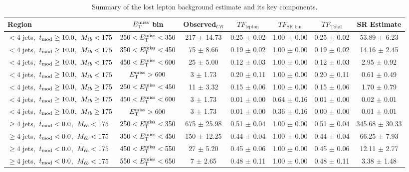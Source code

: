 \begin{table}
\centering
\small
\caption{Summary of the lost lepton background estimate and its key components.}
\label{tab:stop:lostlep:results}
\begin{tabular}{|l|c|c|c|c|c|c|} \hline
Region & $E_\text{T}^\text{miss}$ bin & Observed$_{CR}$ & $TF_\text{lepton}$ & $TF_\text{SR bin}$ & $TF_\text{Total}$ & SR Estimate \\ \hline \hline
 $<4$ jets,~$t_\text{mod} \ge10.0$,~$M_{\ell b} <175$ & $250<E_\text{T}^\text{miss}<350$  & 217 $\pm$ 14.73  & 0.25 $\pm$ 0.02  & 1.00 $\pm$ 0.00 & 0.25 $\pm$ 0.02  & 53.89 $\pm$ 6.23  \\
 $<4$ jets,~$t_\text{mod} \ge10.0$,~$M_{\ell b} <175$ & $350<E_\text{T}^\text{miss}<450$  & 75 $\pm$ 8.66  & 0.19 $\pm$ 0.02  & 1.00 $\pm$ 0.00 & 0.19 $\pm$ 0.02  & 14.16 $\pm$ 2.45  \\
 $<4$ jets,~$t_\text{mod} \ge10.0$,~$M_{\ell b} <175$ & $450<E_\text{T}^\text{miss}<600$  & 25 $\pm$ 5.00  & 0.12 $\pm$ 0.03  & 1.00 $\pm$ 0.00 & 0.12 $\pm$ 0.03  & 2.95 $\pm$ 0.92  \\
 $<4$ jets,~$t_\text{mod} \ge10.0$,~$M_{\ell b} <175$ & $E_\text{T}^\text{miss}>600$  & 3 $\pm$ 1.73  & 0.20 $\pm$ 0.11  & 1.00 $\pm$ 0.00 & 0.20 $\pm$ 0.11  & 0.61 $\pm$ 0.49  \\
\hline
 $<4$ jets,~$t_\text{mod} \ge10.0$,~$M_{\ell b} \ge175$ & $250<E_\text{T}^\text{miss}<450$  & 11 $\pm$ 3.32  & 0.15 $\pm$ 0.06  & 1.00 $\pm$ 0.00 & 0.15 $\pm$ 0.06  & 1.70 $\pm$ 0.79  \\
 $<4$ jets,~$t_\text{mod} \ge10.0$,~$M_{\ell b} \ge175$ & $450<E_\text{T}^\text{miss}<600$  & 3 $\pm$ 1.73  & 0.01 $\pm$ 0.00  & 0.64 $\pm$ 0.16 & 0.01 $\pm$ 0.00  & 0.02 $\pm$ 0.01  \\
 $<4$ jets,~$t_\text{mod} \ge10.0$,~$M_{\ell b} \ge175$ & $E_\text{T}^\text{miss}>600$  & 3 $\pm$ 1.73  & 0.01 $\pm$ 0.00  & 0.36 $\pm$ 0.16 & 0.00 $\pm$ 0.00  & 0.01 $\pm$ 0.01  \\
\hline
 $\ge4$ jets,~$t_\text{mod} <0.0$,~$M_{\ell b} <175$ & $250<E_\text{T}^\text{miss}<350$  & 675 $\pm$ 25.98  & 0.51 $\pm$ 0.04  & 1.00 $\pm$ 0.00 & 0.51 $\pm$ 0.04  & 345.68 $\pm$ 30.33  \\
 $\ge4$ jets,~$t_\text{mod} <0.0$,~$M_{\ell b} <175$ & $350<E_\text{T}^\text{miss}<450$  & 150 $\pm$ 12.25  & 0.44 $\pm$ 0.04  & 1.00 $\pm$ 0.00 & 0.44 $\pm$ 0.04  & 66.25 $\pm$ 7.93  \\
 $\ge4$ jets,~$t_\text{mod} <0.0$,~$M_{\ell b} <175$ & $450<E_\text{T}^\text{miss}<550$  & 27 $\pm$ 5.20  & 0.45 $\pm$ 0.06  & 1.00 $\pm$ 0.00 & 0.45 $\pm$ 0.06  & 12.11 $\pm$ 2.77  \\
 $\ge4$ jets,~$t_\text{mod} <0.0$,~$M_{\ell b} <175$ & $550<E_\text{T}^\text{miss}<650$  & 7 $\pm$ 2.65  & 0.48 $\pm$ 0.11  & 1.00 $\pm$ 0.00 & 0.48 $\pm$ 0.11  & 3.38 $\pm$ 1.48  \\

\end{tabular}
\end{table}
